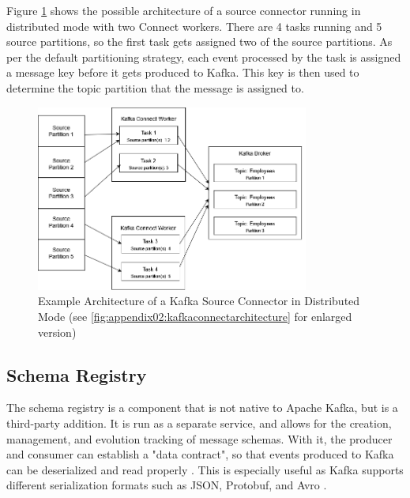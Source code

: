 Figure \ref{fig:fundamentals:kafkaconnectarchitecture} shows the possible architecture of a source connector running in distributed mode with two Connect workers. There are 4 tasks running and 5 source partitions, so the first task gets assigned two of the source partitions. As per the default partitioning strategy, each event processed by the task is assigned a message key before it gets produced to Kafka. This key is then used to determine the topic partition that the message is assigned to.

\begin{figure}[htbp]
 \centering
 \includegraphics[width=0.8\textwidth]{chapters/images/kafka connect architecture enlarged.drawio.png}
 \caption[Example Architecture of a Kafka Source Connector in Distributed Mode]{Example Architecture of a Kafka Source Connector in Distributed Mode (see \ref{fig:appendix02:kafkaconnectarchitecture} for enlarged version)}
 \label{fig:fundamentals:kafkaconnectarchitecture}
\end{figure}


\subsection{Schema Registry}
The schema registry is a component that is not native to Apache Kafka, but is a third-party addition. It is run as a separate service, and allows for the creation, management, and evolution tracking of message schemas. With it, the producer and consumer can establish a "data contract", so that events produced to Kafka can be deserialized and read properly \cite{kreps2011kafka}. This is especially useful as Kafka supports different serialization formats such as JSON, Protobuf, and Avro \cite{kafkadocumentation}.

